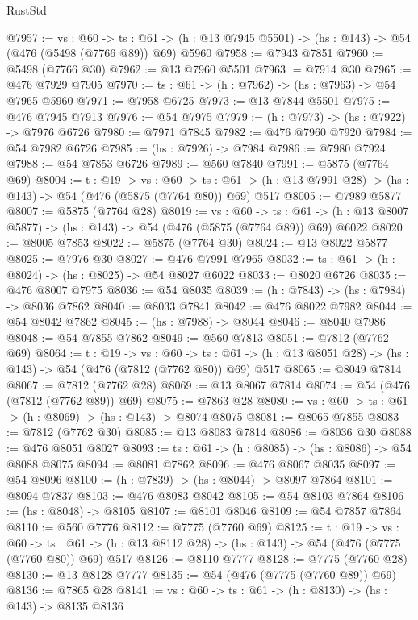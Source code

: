 \begin{lexlean}{RustStd}
\begin{coremodule}
@7957 := {vs : @60} ->
  {ts : @61} -> (h : @13 @7945 @5501) -> (hs : @143) -> @54 (@476 (@5498 (@7766 @89)) @69) @5960
@7958 := @7943 @7851
@7960 := @5498 (@7766 @30)
@7962 := @13 @7960 @5501
@7963 := @7914 @30
@7965 := @476 @7929 @7905
@7970 := {ts : @61} -> (h : @7962) -> (hs : @7963) -> @54 @7965 @5960
@7971 := @7958 @6725
@7973 := @13 @7844 @5501
@7975 := @476 @7945 @7913
@7976 := @54 @7975
@7979 := (h : @7973) -> (hs : @7922) -> @7976 @6726
@7980 := @7971 @7845
@7982 := @476 @7960 @7920
@7984 := @54 @7982 @6726
@7985 := (hs : @7926) -> @7984
@7986 := @7980 @7924
@7988 := @54 @7853 @6726
@7989 := @560 @7840
@7991 := @5875 (@7764 @69)
@8004 := {t : @19} ->
  {vs : @60} ->
  {ts : @61} -> (h : @13 @7991 @28) -> (hs : @143) -> @54 (@476 (@5875 (@7764 @80)) @69) @517
@8005 := @7989 @5877
@8007 := @5875 (@7764 @28)
@8019 := {vs : @60} ->
  {ts : @61} -> (h : @13 @8007 @5877) -> (hs : @143) -> @54 (@476 (@5875 (@7764 @89)) @69) @6022
@8020 := @8005 @7853
@8022 := @5875 (@7764 @30)
@8024 := @13 @8022 @5877
@8025 := @7976 @30
@8027 := @476 @7991 @7965
@8032 := {ts : @61} -> (h : @8024) -> (hs : @8025) -> @54 @8027 @6022
@8033 := @8020 @6726
@8035 := @476 @8007 @7975
@8036 := @54 @8035
@8039 := (h : @7843) -> (hs : @7984) -> @8036 @7862
@8040 := @8033 @7841
@8042 := @476 @8022 @7982
@8044 := @54 @8042 @7862
@8045 := (hs : @7988) -> @8044
@8046 := @8040 @7986
@8048 := @54 @7855 @7862
@8049 := @560 @7813
@8051 := @7812 (@7762 @69)
@8064 := {t : @19} ->
  {vs : @60} ->
  {ts : @61} -> (h : @13 @8051 @28) -> (hs : @143) -> @54 (@476 (@7812 (@7762 @80)) @69) @517
@8065 := @8049 @7814
@8067 := @7812 (@7762 @28)
@8069 := @13 @8067 @7814
@8074 := @54 (@476 (@7812 (@7762 @89)) @69)
@8075 := @7863 @28
@8080 := {vs : @60} -> {ts : @61} -> (h : @8069) -> (hs : @143) -> @8074 @8075
@8081 := @8065 @7855
@8083 := @7812 (@7762 @30)
@8085 := @13 @8083 @7814
@8086 := @8036 @30
@8088 := @476 @8051 @8027
@8093 := {ts : @61} -> (h : @8085) -> (hs : @8086) -> @54 @8088 @8075
@8094 := @8081 @7862
@8096 := @476 @8067 @8035
@8097 := @54 @8096
@8100 := (h : @7839) -> (hs : @8044) -> @8097 @7864
@8101 := @8094 @7837
@8103 := @476 @8083 @8042
@8105 := @54 @8103 @7864
@8106 := (hs : @8048) -> @8105
@8107 := @8101 @8046
@8109 := @54 @7857 @7864
@8110 := @560 @7776
@8112 := @7775 (@7760 @69)
@8125 := {t : @19} ->
  {vs : @60} ->
  {ts : @61} -> (h : @13 @8112 @28) -> (hs : @143) -> @54 (@476 (@7775 (@7760 @80)) @69) @517
@8126 := @8110 @7777
@8128 := @7775 (@7760 @28)
@8130 := @13 @8128 @7777
@8135 := @54 (@476 (@7775 (@7760 @89)) @69)
@8136 := @7865 @28
@8141 := {vs : @60} -> {ts : @61} -> (h : @8130) -> (hs : @143) -> @8135 @8136

\end{coremodule}
\end{lexlean}
